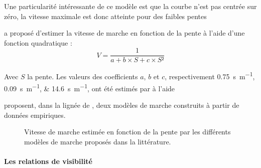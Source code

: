 Une particularité intéressante de ce modèle est que la courbe n'est
pas centrée sur zéro, la vitesse maximale est donc atteinte pour des
faibles pentes

\textcite{Rees2004} a proposé d'estimer la vitesse de marche en
fonction de la pente à l'aide d'une fonction quadratique :
\begin{equation}
  V = \dfrac{1}{a + b × S + c × S²}
\end{equation}

Avec \(S\) la pente. Les valeurs des coefficients \(a\), \(b\) et
\(c\), respectivement \SIlist{0,75;0,09;14,6}{\second\per\meter}, ont
été estimés par \textcite{Rees2004} à l'aide

\textcite{Irmisher2017,Kerouanton2020} proposent, dans la lignée de
\textcite{Tobler1993}, deux modèles de marche construits à partir de
données empiriques.


\begin{figure}
  \centering 
  \caption{Vitesse de marche estimée en fonction de la pente par les
    différents modèles de marche proposés dans la littérature.}
  \label{fig:modeles_marche}
\end{figure}

\paragraph{Les relations de visibilité}



